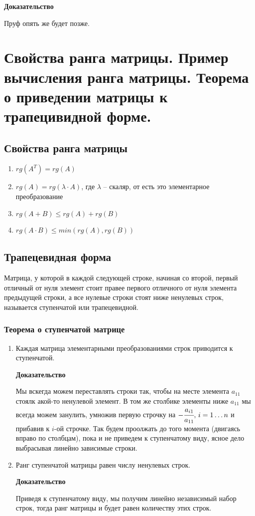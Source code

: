 \documentclass{article}
\begin{document}
\textbf{Доказательство}

Пруф опять же будет позже.

\newpage
\section{Свойства ранга матрицы. Пример вычисления ранга матрицы. Теорема о приведении матрицы к трапецивидной форме.}
\subsection{Свойства ранга матрицы}
\begin{enumerate}
    \item $rg(A^T)=rg(A)$
    \item $rg(A)=rg(\lambda\cdot A)$, где $\lambda$ -- скаляр, от есть это элементарное преобразование
    \item $rg(A+B)\leqslant rg(A)+rg(B)$
    \item $rg(A\cdot B)\leqslant min(rg(A),rg(B))$
\end{enumerate}

\subsection{Трапецевидная форма}
Матрица, у которой в каждой следующей строке, начиная со второй, первый отличный от нуля элемент стоит правее первого отличного от нуля элемента предыдущей строки, а все нулевые строки стоят ниже ненулевых строк, называется ступенчатой или трапецевидной.

\subsubsection{Теорема о ступенчатой матрице}
\begin{enumerate}
    \item Каждая матрица элементарными преобразованиями строк приводится к ступенчатой.
    
    \textbf{Доказательство}
    
    Мы вскегда можем переставлять строки так, чтобы на месте элемента $a_{11}$ стоялк акой-то ненулевой элемент. В том же столбике элементы ниже $a_{11}$ мы всегда можем занулить, умножив первую строчку на $-\cfrac{a_{i1}}{a_{11}},\,i=1\ldots n$ и прибавив к $i$-ой строчке. Так будем проолжать до того момента (двигаясь вправо по столбцам), пока и не приведем к ступенчатому виду, ясное дело выбрасывая линейно зависимые строки.
    
    \item Ранг ступенчатой матрицы равен числу ненулевых строк.
    
    \textbf{Доказательство}
    
    Приведя к ступенчатому виду, мы получим линейно независимый набор строк, тогда ранг матрицы и будет равен количеству этих строк.
\end{enumerate}
\end{document}
